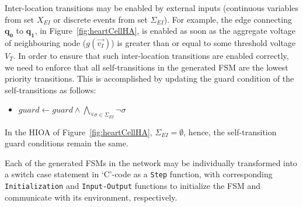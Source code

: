 Inter-location transitions may be enabled by external inputs (continuous 
variables from set $X_{EI}$ or discrete events from set $\Sigma_{EI}$). For 
example, the edge connecting $\mathbf{q_{0}}$ to $\mathbf{q_{1}}$, in 
Figure~\ref{fig:heartCellHA},
is enabled as soon as the aggregate voltage of neighbouring node
($g(\vec{v_{I}})$) is greater than or equal to some threshold voltage
$V_{T}$. In order to ensure that such inter-location transitions are
enabled correctly, we need to enforce that all self-transitions in the
generated \ac{FSM} are the lowest priority transitions. This is
accomplished by updating the guard condition of the self-transitions as
follows:
\begin{itemize}
\item
  $guard \leftarrow guard \wedge \bigwedge_{\forall \sigma \in
    \Sigma_{EI}} \neg \sigma$
\end{itemize}

In the \ac{HIOA} of Figure~\ref{fig:heartCellHA},
$\Sigma_{EI} = \emptyset$, hence, the self-transition guard conditions
remain the same.


Each of the generated \acp{FSM} in the network may be individually
transformed into a switch case statement in `C'-code as a \texttt{Step} 
function, with corresponding \texttt{Initialization} and \texttt{Input-Output}
functions to initialize the \ac{FSM} and communicate with its
environment, respectively.


